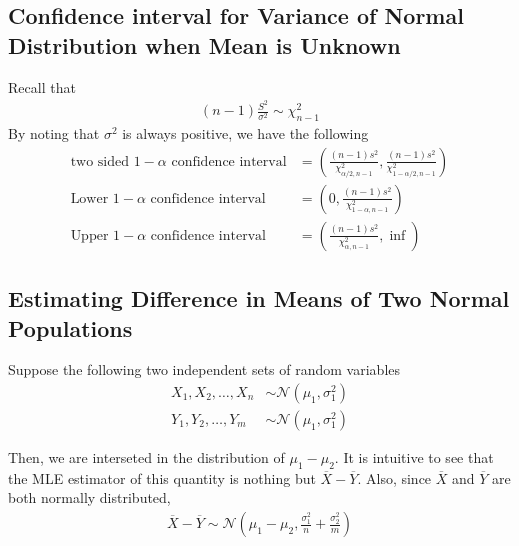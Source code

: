 \documentclass[../probability-notes.tex]{subfiles}
\begin{document}
    
    \subsection{Confidence interval for Variance of Normal Distribution when Mean is Unknown}
    Recall that
    \begin{align*}
        (n-1)\frac{S^{2}}{\sigma^{2}} \sim \chi_{n-1}^{2}
    \end{align*}
    By noting that $\sigma^{2}$ is always positive, we have the following
    \begin{align*}
        \text{two sided $1 - \alpha$ confidence interval} &= (\frac{(n-1)s^{2}}{\chi_{\alpha/2, n-1}^{2}}, \frac{(n-1)s^{2}}{\chi_{1 - \alpha/2, n-1}^{2}})\\
        \text{Lower $1-\alpha$ confidence interval} &= (0, \frac{(n-1)s^{2}}{\chi_{1 - \alpha, n-1}^{2}})\\
        \text{Upper $1-\alpha$ confidence interval} &= (\frac{(n-1)s^{2}}{\chi_{\alpha, n-1}^{2}}, \inf)        
    \end{align*}


    \subsection{Estimating Difference in Means of Two Normal Populations}\label{mean_diff_normal}
    Suppose the following two independent sets of random variables
    \begin{align*}
        X_{1}, X_{2}, \ldots, X_{n} &\sim \mathcal{N}(\mu_{1}, \sigma_{1}^{2})\\
        Y_{1}, Y_{2}, \ldots, Y_{m} &\sim \mathcal{N}(\mu_{1}, \sigma_{1}^{2})
    \end{align*}

    Then, we are interseted in the distribution of $\mu_{1} - \mu_{2}$. It is intuitive to see that the MLE estimator of this quantity is nothing but $\overline{X} - \overline{Y}$. Also, since $\overline{X}$ and $\overline{Y}$ are both normally distributed,
    \begin{align*}
        \overline{X} - \overline{Y} \sim \mathcal{N}(\mu_{1} - \mu_{2}, \frac{\sigma_{1}^{2}}{n} + \frac{\sigma_{2}^{2}}{m})
    \end{align*}
\end{document}
